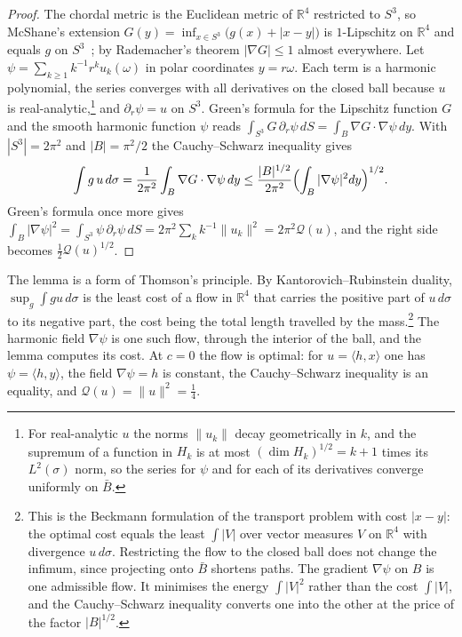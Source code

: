 \documentclass[11pt]{amsart}
\theoremstyle{definition}
\theoremstyle{remark}
\numberwithin{equation}{section}
\newcommand{\R}{\mathbb{R}}
\newcommand{\ip}[2]{\langle #1,#2\rangle}
\begin{document}
\begin{proof}
The chordal metric is the Euclidean metric of $\R^4$ restricted to $S^3$,
so McShane's extension $G(y)=\inf_{x\in S^3}\bigl(g(x)+|x-y|\bigr)$
is $1$-Lipschitz on $\R^4$ and equals $g$ on $S^3$~\cite{McS34}; by
Rademacher's theorem $|\nabla G|\le1$ almost everywhere. Let
$\psi=\sum_{k\ge1}k^{-1}r^ku_k(\omega)$ in polar coordinates $y=r\omega$. Each
term is a harmonic polynomial, the series converges with all derivatives on
the closed ball because $u$ is real-analytic,\footnote{For real-analytic
$u$ the norms $\|u_k\|$ decay geometrically in $k$, and the supremum of a
function in $H_k$ is at most $(\dim H_k)^{1/2}=k+1$ times its $L^2(\sigma)$
norm, so the series for $\psi$ and for each of its derivatives converge
uniformly on $\bar B$.} and $\partial_r\psi=u$ on $S^3$. Green's formula for
the Lipschitz function $G$ and the smooth harmonic function $\psi$ reads
$\int_{S^3}G\,\partial_r\psi\,dS=\int_B\nabla G\cdot\nabla\psi\,dy$. With
$|S^3|=2\pi^2$ and $|B|=\pi^2/2$ the Cauchy--Schwarz inequality gives
\[
\int g\,u\,d\sigma=\frac1{2\pi^2}\int_B\nabla G\cdot\nabla\psi\,dy\le
\frac{|B|^{1/2}}{2\pi^2}\Bigl(\int_B|\nabla\psi|^2dy\Bigr)^{1/2}.
\]
Green's formula once more gives $\int_B|\nabla\psi|^2=\int_{S^3}\psi\,
\partial_r\psi\,dS=2\pi^2\sum_kk^{-1}\|u_k\|^2=2\pi^2\mathcal Q(u)$, and the
right side becomes $\frac12\mathcal Q(u)^{1/2}$.
\end{proof}

The lemma is a form of Thomson's principle. By Kantorovich--Rubinstein
duality, $\sup_g\int gu\,d\sigma$ is the least cost of a flow in $\R^4$ that
carries the positive part of $u\,d\sigma$ to its negative part, the cost
being the total length travelled by the mass.\footnote{This is the
Beckmann formulation of the transport problem with cost $|x-y|$: the
optimal cost equals the least $\int|V|$ over vector measures $V$ on $\R^4$
with divergence $u\,d\sigma$. Restricting the flow to the closed ball does
not change the infimum, since projecting onto $\bar B$ shortens paths. The
gradient $\nabla\psi$ on $B$ is one admissible flow. It minimises the energy
$\int|V|^2$ rather than the cost $\int|V|$, and the Cauchy--Schwarz inequality
converts one into the other at the price of the factor $|B|^{1/2}$.} The
harmonic field $\nabla\psi$ is one such flow, through the interior of the
ball, and the lemma computes its cost. At $c=0$ the flow is optimal: for
$u=\ip hx$ one has $\psi=\ip hy$, the field $\nabla\psi=h$ is constant,
the Cauchy--Schwarz inequality is an equality, and $\mathcal Q(u)=\|u\|^2=
\frac14$.
\end{document}
